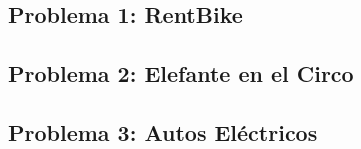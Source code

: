\documentclass[12pt]{article}
\begin{document}
\thispagestyle{fancy}

\subsection*{Problema 1: RentBike}


\subsection*{Problema 2: Elefante en el Circo}


\subsection*{Problema 3: Autos Eléctricos}

\end{document}
